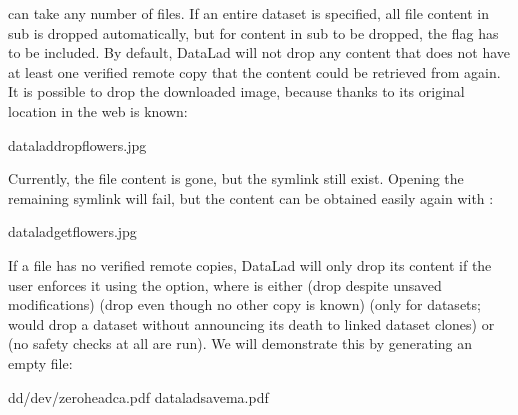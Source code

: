 \sphinxAtStartPar
{} can take any number of files.
If an entire dataset is specified, all file content in sub\sphinxhyphen{} is
dropped automatically, but for content in sub\sphinxhyphen{} to be dropped, the
 flag has to be included.
By default, DataLad will not drop any content that does not have at least
one verified remote copy that the content could be retrieved from again.
It is possible to drop the downloaded image, because thanks to
 its original location in the web is known:

\begin{sphinxVerbatim}[commandchars=\\\{\}]
dataladdropflowers.jpg
\end{sphinxVerbatim}

\sphinxAtStartPar
Currently, the file content is gone, but the symlink still exist. Opening the
remaining symlink will fail, but the content can be obtained easily again with
:

\begin{sphinxVerbatim}[commandchars=\\\{\}]
dataladgetflowers.jpg
\end{sphinxVerbatim}

\sphinxAtStartPar
If a file has no verified remote copies, DataLad will only drop its
content if the user enforces it using the  option, where \sphinxcode{\sphinxupquote{{[}MODE{]}}} is either  (drop despite unsaved modifications)  (drop even though no other copy is known)  (only for datasets; would drop a dataset without announcing its death to linked dataset clones) or  (no safety checks at all are run).
We will demonstrate this by generating an empty file:

\begin{sphinxVerbatim}[commandchars=\\\{\}]
dd/dev/zerohead\PYGZhy{}c\PYGZgt{}a.pdf
dataladsave\PYGZhy{}ma.pdf
\end{sphinxVerbatim}

